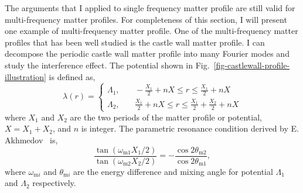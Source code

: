 

The arguments that I applied to single frequency matter profile are still valid for multi-frequency matter profiles. For completeness of this section, I will present one example of multi-frequency matter profile. One of the multi-frequency matter profiles that has been well studied is the castle wall matter profile. I can decompose the periodic castle wall matter profile into many Fourier modes and study the interference effect. The potential shown in Fig.~\ref{fig-castlewall-profile-illustration} is defined as,
\begin{equation}
    \lambda(r) = \begin{cases}
\Lambda_1, &\quad -\frac{X_1}{2}+nX\le r\le \frac{X_1}{2}+nX \\
\Lambda_2, &\quad \frac{X_1}{2}+nX\le r\le \frac{X_1}{2}+\frac{X_2}{2} +nX
\end{cases}
\label{eq-castle-wall-potential}
\end{equation}
where $X_1$ and $X_2$ are the two periods of the matter profile or potential, $X=X_1+X_2$, and $n$ is integer. The parametric resonance condition derived by E. Akhmedov~\cite{Akhmedov2000} is,
\begin{equation}
    \frac{\tan (\omega_{\mathrm m1}X_1/2)}{\tan (\omega_{\mathrm m2}X_2/2)} = - \frac{\cos 2\theta_{\mathrm m2}}{\cos 2\theta_{\mathrm m1}},
    \label{eq-akhmedov-resonance-condition-castle-wall}
\end{equation}
where $\omega_{\mathrm{m}i}$ and $\theta_{\mathrm{m}i}$ are the energy difference and mixing angle for potential $\Lambda_1$ and $\Lambda_2$ respectively.

